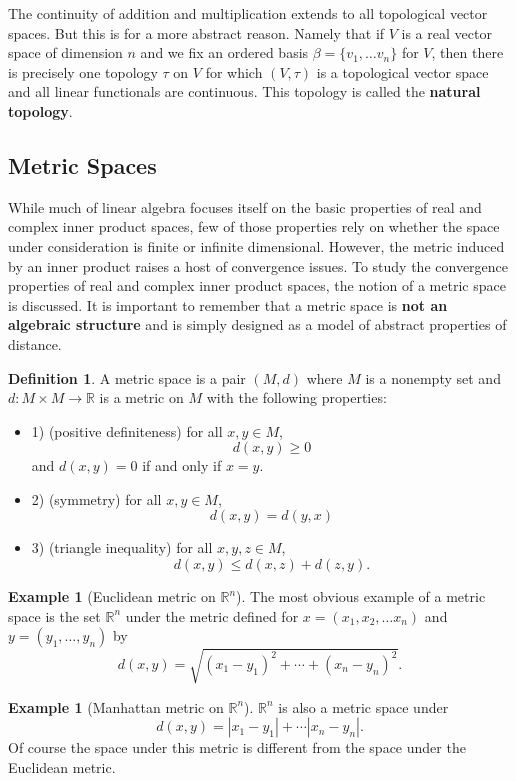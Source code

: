 \documentclass{article}
\theoremstyle{definition}
\newtheorem{exmp}[thm]{Example}
\newtheorem{defn}[thm]{Definition}
\theoremstyle{remark}
\numberwithin{equation}{section}
\begin{document}
The continuity of addition and multiplication extends to all topological vector spaces. But this is for a more abstract reason. Namely that if $V$ is a real vector space of dimension $n$ and we fix an ordered basis $\beta = \{ v_1, \dots v_n \}$ for $V$, then there is precisely one topology $\tau$ on $V$ for which $(V, \tau)$ is a topological vector space and all linear functionals are continuous. This topology is called the \textbf{natural topology}. 

\subsection{Metric Spaces}
While much of linear algebra focuses itself on the basic properties of real and complex inner product spaces, few of those properties rely on whether the space under consideration is finite or infinite dimensional. However, the metric induced by an inner product raises a host of convergence issues. To study the convergence properties of real and complex inner product spaces, the notion of a metric space is discussed. It is important to remember that a metric space is \textbf{not an algebraic structure} and is simply designed as a model of abstract properties of distance. 

\begin{defn}
A metric space is a pair $(M, d)$ where $M$ is a nonempty set and $d : M \times M \rightarrow \mathbb{R}$ is a metric on $M$ with the following properties: 
\begin{itemize}
    \item 1) (positive definiteness) for all $x,y \in M$, 
    $$d(x,y) \geq 0 $$
    and $d(x,y) = 0$ if and only if $x = y$. 
    \item 2) (symmetry) for all $x, y \in M$, 
    $$d(x,y) = d(y,x)$$
    \item 3) (triangle inequality) for all $x,y,z \in M$, 
     $$d (x,y) \leq d(x,z) + d(z,y).$$
\end{itemize}
\end{defn}

\begin{exmp} [Euclidean metric on $\mathbb{R}^n$]
The most obvious example of a metric space is the set $\mathbb{R}^n$ under the metric defined for $x = (x_1, x_2, \dots x_n)$ and $y = (y_1, \dots , y_n)$ by 
$$d(x,y) = \sqrt{(x_1-y_1)^2 + \cdots + (x_n - y_n)^2}.$$
\end{exmp}

\begin{exmp}[Manhattan metric on $\mathbb{R}^n$]
$\mathbb{R}^n$ is also a metric space under 
$$d(x,y) = |x_1 - y_1 | + \cdots |x_n - y_n |.$$
Of course the space under this metric is different from the space under the Euclidean metric. 
\end{exmp}
\end{document}
